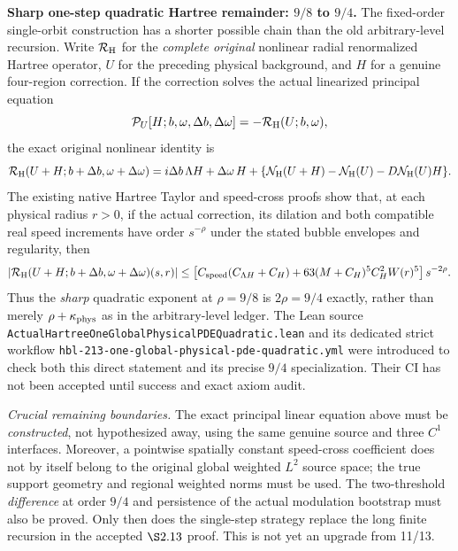 \documentclass[11pt]{amsart}
\begin{document}
\medskip
\noindent\textbf{Sharp one-step quadratic Hartree remainder: $9/8$ to $9/4$.}
The fixed-order single-orbit construction has a shorter possible chain than
the old arbitrary-level recursion.  Write $\mathcal R_{\rm H}$ for the
\emph{complete original} nonlinear radial renormalized Hartree operator,
$U$ for the preceding physical background, and $H$ for a genuine
four-region correction.  If the correction solves the actual
linearized principal equation
\[
 \mathcal P_{U}[H;b,\omega,\Delta b,\Delta\omega]
  =-\mathcal R_{\rm H}(U;b,\omega),
\]
the exact original nonlinear identity is
\[
 \mathcal R_{\rm H}(U+H;b+\Delta b,\omega+\Delta\omega)
  =i\Delta b\,\Lambda H+\Delta\omega\,H+
    \{\mathcal N_{\rm H}(U+H)-\mathcal N_{\rm H}(U)
                   -D\mathcal N_{\rm H}(U)H\}.
\]
The existing native Hartree Taylor and speed-cross proofs show that,
at each physical radius $r>0$, if the actual correction, its dilation
and both compatible real speed increments have order $s^{-\rho}$
under the stated bubble envelopes and regularity, then
\[
 \left|\mathcal R_{\rm H}
    (U+H;b+\Delta b,\omega+\Delta\omega)(s,r)\right|
 \le\left[
 C_{\rm speed}(C_{\Lambda H}+C_H)
 +63(M+C_H)^5C_H^2W(r)^5
 \right]s^{-2\rho}.
\]
Thus the \emph{sharp} quadratic exponent at $\rho=9/8$ is
$2\rho=9/4$ exactly, rather than merely
$\rho+\kappa_{\rm phys}$ as in the arbitrary-level ledger.
The Lean source
\texttt{ActualHartreeOneGlobalPhysicalPDEQuadratic.lean}
and its dedicated strict workflow
\texttt{hbl-213-one-global-physical-pde-quadratic.yml}
were introduced to check both this direct statement and its precise
$9/4$ specialization.  Their CI has not been accepted until success
and exact axiom audit.

\emph{Crucial remaining boundaries.} The exact principal linear
equation above must be \emph{constructed}, not hypothesized away, using
the same genuine source and three $C^1$ interfaces.  Moreover, a
pointwise spatially constant speed-cross coefficient does not by
itself belong to the original global weighted $L^2$ source space;
the true support geometry and regional weighted norms must be used.
The two-threshold \emph{difference} at order $9/4$ and persistence
of the actual modulation bootstrap must also be proved.  Only then
does the single-step strategy replace the long finite recursion
in the accepted $\S2.13$ proof.  This is not yet an upgrade from 11/13.
\end{document}
